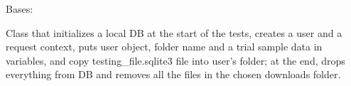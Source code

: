 \documentclass[letterpaper,10pt,english]{sphinxmanual}
\begin{document}
\begin{fulllineitems}
\label{\detokenize{CE_app.tests:CE_app.tests.BaseTrialTestClass}}
\sphinxAtStartPar
Bases: 

\sphinxAtStartPar
Class that initializes a local DB at the start of the tests, creates a user and a request context, 
puts user object, folder name and a trial sample data in variables, and copy testing\_file.sqlite3 file into user’s folder;
at the end, drops everything from DB and removes all the files in the chosen downloads folder.


\end{fulllineitems}
\end{document}

